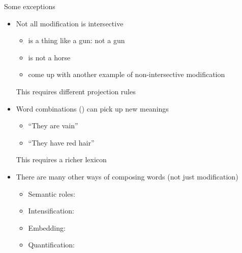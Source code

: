 \begin{frame}{Some exceptions}

\begin{itemize}%
\item Not all modification is intersective
  \begin{itemize}
  \item {} is a thing like a gun: not a gun
  \item {} is not a horse
  \item[?] come up with another example of non-intersective modification\task 
  \end{itemize}
  This requires different projection rules
\item Word combinations () can pick up new
  meanings
  \begin{itemize}
  \item {} ``They are vain''
  \item {} ``They have red hair''
  \end{itemize}
  This requires a richer lexicon
\item There are many other ways of composing words (not just modification)
  \begin{itemize}
  \item Semantic roles: 
  \item Intensification: 
  \item Embedding: 
  \item Quantification: 
  \end{itemize}
\end{itemize}

\end{frame}

